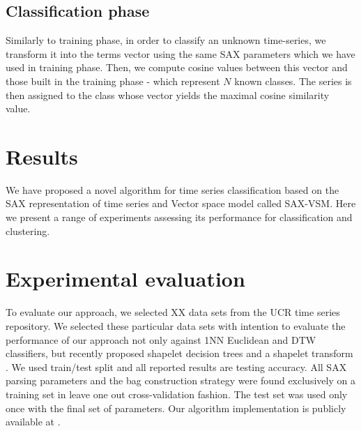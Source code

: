 \documentclass{llncs}
\begin{document}
\subsection{Classification phase}
Similarly to training phase, in order to classify an unknown time-series, we transform it into the
terms vector using the same SAX parameters which we have used in training phase. Then, we compute
cosine values between this vector and those built in the training phase - which represent $N$ known
classes. The series is then assigned to the class whose vector yields the maximal cosine similarity
value.

\section{Results}
We have proposed a novel algorithm for time series classification based on the SAX
representation of time series and Vector space model called SAX-VSM. Here we present a range of
experiments assessing its performance for classification and clustering.

\section{Experimental evaluation}
To evaluate our approach, we selected XX data sets from the UCR time series repository.
We selected these particular data sets with intention to evaluate the performance of our approach
not only against 1NN Euclidean and DTW classifiers, but recently proposed shapelet decision trees
and a shapelet transform \cite{bagnal}.
We used train/test split and all reported results are testing accuracy. All SAX parsing parameters
and the bag construction strategy were found exclusively on a training set in leave one out 
cross-validation fashion. The test set was used only once with the final set of parameters. 
Our algorithm implementation is publicly available at \cite{jmotif}.
\end{document}
